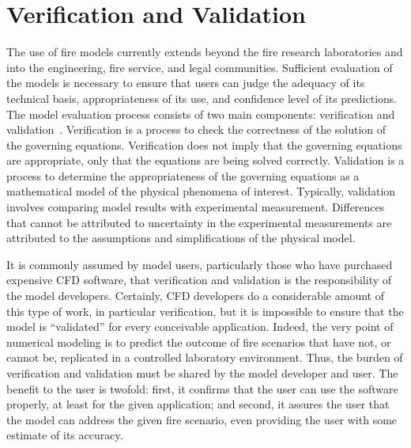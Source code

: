 \documentclass[graybox]{svmult}
\begin{document}
\section{Verification and Validation}

The use of fire models currently extends beyond the fire research laboratories and into the engineering, fire service, and legal communities. Sufficient evaluation of the models is necessary to ensure that users can judge the adequacy of its technical basis, appropriateness of its use, and confidence level of its predictions. The model evaluation process consists of two main components: verification and validation~\cite{ASTM:E1355}. Verification is a process to check the correctness of the solution of the governing equations. Verification does not imply that the governing equations are appropriate, only that the equations are being solved correctly. Validation is a process to determine the appropriateness of the governing equations as a mathematical model of the physical phenomena of interest. Typically, validation involves comparing model results with experimental measurement. Differences that cannot be attributed to uncertainty in the experimental measurements are attributed to the assumptions and simplifications of the physical model.

It is commonly assumed by model users, particularly those who have purchased expensive CFD software, that verification and validation is the responsibility of the model developers. Certainly, CFD developers do a considerable amount of this type of work, in particular verification, but it is impossible to ensure that the model is ``validated'' for every conceivable application. Indeed, the very point of numerical modeling is to predict the outcome of fire scenarios that have not, or cannot be, replicated in a controlled laboratory environment. Thus, the burden of verification and validation must be shared by the model developer and user. The benefit to the user is twofold: first, it confirms that the user can use the software properly, at least for the given application; and second, it assures the user that the model can address the given fire scenario, even providing the user with some estimate of its accuracy.
\end{document}
